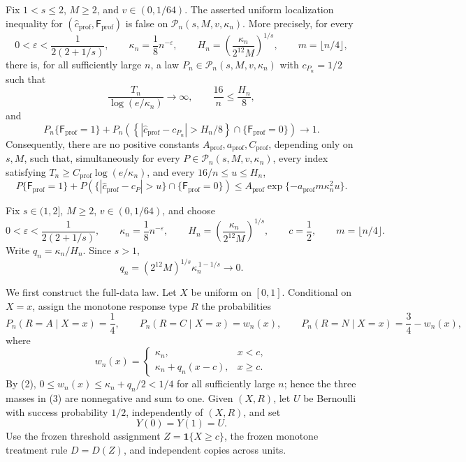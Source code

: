 Fix \(1<s\le2\), \(M\ge2\), and \(v\in(0,1/64)\).  The asserted
uniform localization inequality for
\((\widehat c_{\mathrm{prof}},\mathsf F_{\mathrm{prof}})\) is false on
\(\mathcal P_n(s,M,v,\kappa_n)\).  More precisely, for every
\[
 0<\varepsilon<\frac{1}{2(2+1/s)},
 \qquad \kappa_n=\frac18n^{-\varepsilon},
 \qquad H_n=\left(\frac{\kappa_n}{2^{12}M}\right)^{1/s},
 \qquad m=\lfloor n/4\rfloor,
\]
there is, for all sufficiently large \(n\), a law
\(P_n\in\mathcal P_n(s,M,v,\kappa_n)\) with \(c_{P_n}=1/2\) such that
\[
 \frac{T_n}{\log(e/\kappa_n)}\longrightarrow\infty,
 \qquad \frac{16}{n}\le\frac{H_n}{8},
\]
and
\[
 P_n\{\mathsf F_{\mathrm{prof}}=1\}
 +P_n\!\left(\left\{|\widehat c_{\mathrm{prof}}-c_{P_n}|>
                    H_n/8\right\}
       \cap\{\mathsf F_{\mathrm{prof}}=0\}\right)
 \longrightarrow1.
\]
Consequently, there are no positive constants
\(A_{\mathrm{prof}},a_{\mathrm{prof}},C_{\mathrm{prof}}\), depending
only on \(s,M\), such that, simultaneously for every
\(P\in\mathcal P_n(s,M,v,\kappa_n)\), every index satisfying
\(T_n\ge C_{\mathrm{prof}}\log(e/\kappa_n)\), and every
\(16/n\le u\le H_n\),
\[
 P\{\mathsf F_{\mathrm{prof}}=1\}
 +P\!\left(\{|\widehat c_{\mathrm{prof}}-c_P|>u\}
       \cap\{\mathsf F_{\mathrm{prof}}=0\}\right)
 \le A_{\mathrm{prof}}\exp\{-a_{\mathrm{prof}}m\kappa_n^2u\}.
\]

Fix \(s\in(1,2]\), \(M\ge2\), \(v\in(0,1/64)\), and choose
\[
 0<\varepsilon<\frac{1}{2(2+1/s)},
 \qquad
 \kappa_n=\frac18 n^{-\varepsilon},
 \qquad
 H_n=\left(\frac{\kappa_n}{2^{12}M}\right)^{1/s},
 \qquad c=\frac12,
 \qquad m=\lfloor n/4\rfloor.
 \tag{1}
\]
Write \(q_n=\kappa_n/H_n\).  Since \(s>1\),
\[
 q_n=(2^{12}M)^{1/s}\kappa_n^{\,1-1/s}\longrightarrow0.
 \tag{2}
\]

We first construct the full-data law.  Let \(X\) be uniform on
\([0,1]\).  Conditional on \(X=x\), assign the monotone response type
\(R\) the probabilities
\[
 P_n(R=A\mid X=x)=\frac14,
 \qquad
 P_n(R=C\mid X=x)=w_n(x),
 \qquad
 P_n(R=N\mid X=x)=\frac34-w_n(x),
 \tag{3}
\]
where
\[
 w_n(x)=
 \begin{cases}
  \kappa_n,&x<c,\\
  \kappa_n+q_n(x-c),&x\ge c.
 \end{cases}
 \tag{4}
\]
By (2), \(0\le w_n(x)\le\kappa_n+q_n/2<1/4\) for all sufficiently
large \(n\); hence the three masses in (3) are nonnegative and sum to
one.  Given \((X,R)\), let \(U\) be Bernoulli with success probability
\(1/2\), independently of \((X,R)\), and set
\[
 Y(0)=Y(1)=U.
 \tag{5}
\]
Use the frozen threshold assignment \(Z=\mathbf 1\{X\ge c\}\), the
frozen monotone treatment rule \(D=D(Z)\), and independent copies
across units.

